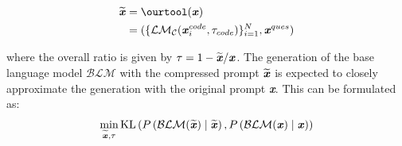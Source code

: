 \begin{align}
\widetilde{\textbf{\textit{x}}} &= \ourtool(\textbf{\textit{x}}) \\
&= (\{\mathcal{LM_C}(\textbf{\textit{x}}_i^{code},\tau_{code} )\}_{i=1}^N, \textbf{\textit{x}}^{ques}) \nonumber
\end{align}

\noindent where the overall ratio is given by $\tau=1-\widetilde{\textbf{\textit{x}}}/\textbf{\textit{x}}$.
The generation of the base language model $\mathcal{\mathcal{BLM}}$ with the compressed prompt $\widetilde{\textbf{\textit{x}}}$ is expected to closely approximate the generation with the original prompt \textbf{\textit{x}}. This can be formulated as: 
\begin{align}
\min _{\widetilde{\boldsymbol{x}}, \tau} \operatorname{KL}\left(P\left(\mathcal{BLM}(\widetilde{\textbf{\textit{x}}})\mid \widetilde{\textbf{\textit{x}}}\right), P\left(\mathcal{BLM}(\textbf{\textit{x}}) \mid \textbf{\textit{x}}\right)\right)
\end{align}

